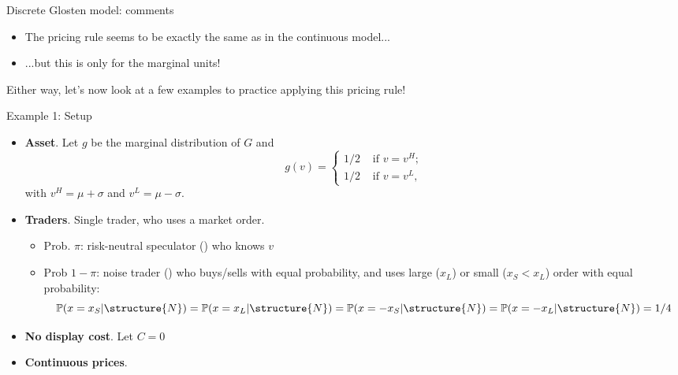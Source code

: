 \documentclass[english,10pt
,aspectratio=169
]{beamer}
\begin{document}
\begin{frame}{Discrete Glosten model: comments}
	\begin{itemize}
		\item The pricing rule seems to be exactly the same as in the continuous model...
		\item ...but this is only for the marginal units! 
	\end{itemize}
	\bigskip 
	Either way, let's now look at a few examples to practice applying this pricing rule!
\end{frame}


\begin{frame}{Example 1: Setup} 
	\begin{itemize}
		\item \textbf{Asset}. Let $g$ be the marginal distribution of $G$ and
		\[
		g(v)=\left\{ \begin{aligned}
		1/2  & \text{ if } v=v^H; \\
		1/2 & \text{ if } v=v^L,
		\end{aligned}
		\right.
		\]
		with $v^{H}=\mu + \sigma $ and $v^{L}= \mu - \sigma $.
		\item \textbf{Traders}. Single trader, who uses a market order.
		\begin{itemize}
			\item Prob. $\pi$: risk-neutral speculator () who knows $v$
			\item Prob $1-\pi$: noise trader ()  who buys/sells with equal probability, and uses large ($x_L$) or small ($x_S<x_L$) order with equal probability:
			$$
			\mathbb{P}(x=x_S|\structure{N})= \mathbb{P}(x=x_L|\structure{N})=\mathbb{P}(x=-x_S|\structure{N})=\mathbb{P}(x=-x_L|\structure{N})=1/4
			$$
		\end{itemize}
		\item \textbf{No display cost}. Let $C=0$
		\item \textbf{Continuous prices}.
	\end{itemize}
\end{frame}
\end{document}
